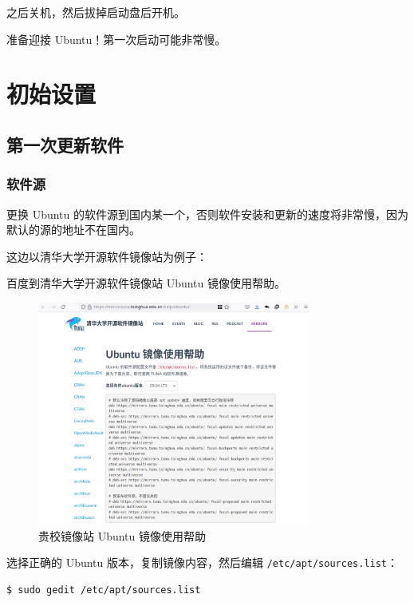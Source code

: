\documentclass[UTF-8]{ctexart}
\begin{document}
				之后关机，然后拔掉启动盘后开机。
				
				准备迎接 Ubuntu！第一次启动可能非常慢。
			
	\newpage
		
	\section{初始设置}
	
		\subsection{第一次更新软件}
		
			\subsubsection{软件源}
		
				更换 Ubuntu 的软件源到国内某一个，否则软件安装和更新的速度将非常慢，因为默认的源的地址不在国内。
				
				这边以清华大学开源软件镜像站为例子：
				
				百度到清华大学开源软件镜像站 Ubuntu 镜像使用帮助。
					
				\begin{figure}[H]
					\centering
					\includegraphics[width=0.8\textwidth]{fig/ubuntu_mirror_help.png}
					\caption*{贵校镜像站 Ubuntu 镜像使用帮助}
				\end{figure}
			
				选择正确的 Ubuntu 版本，复制镜像内容，然后编辑 \texttt{/etc/apt/sources.list}：
	
				\begin{verbatim}
$ sudo gedit /etc/apt/sources.list
				\end{verbatim}
			
\end{document}
